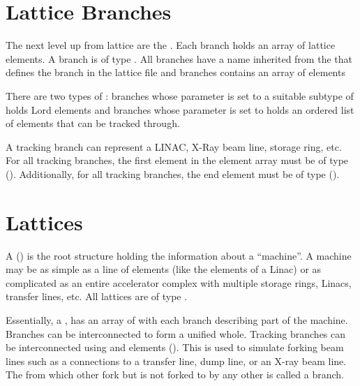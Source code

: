 \section{Lattice Branches}
\label{s:branch.def}

The next level up from lattice  are the .
Each branch holds an array of lattice elements. 
A branch is of type . All
branches have a name  inherited from the  that defines
the branch in the lattice file and branches contains an array of elements 

There are two types of : branches whose  parameter is set to
a suitable subtype of  holds Lord elements and 
branches whose  parameter is set to   holds an ordered
list of elements that can be tracked through.

A tracking branch can represent a LINAC, X-Ray beam line, storage ring, etc.
For all tracking branches, the first element in the element array
must be of type  ().
Additionally, for all tracking branches, 
the end element must be of type  ().

\section{Lattices}
\label{s:lattice.def}

A  () is the root structure holding the information about a
``machine''. A machine may be as simple as a line of elements (like the elements of a Linac) or
as complicated as an entire accelerator complex with multiple storage rings, Linacs, transfer
lines, etc. All lattices are of type .

Essentially, a , has an array of  with each branch describing part of the
machine. Branches can be interconnected to form a unified whole.
Tracking branches can be interconnected using  and  elements (). 
This is used to simulate forking beam lines such as a connections to a transfer line, dump line, or an
X-ray beam line. The  from which other  fork but is not forked to by any
other  is called a  branch.

